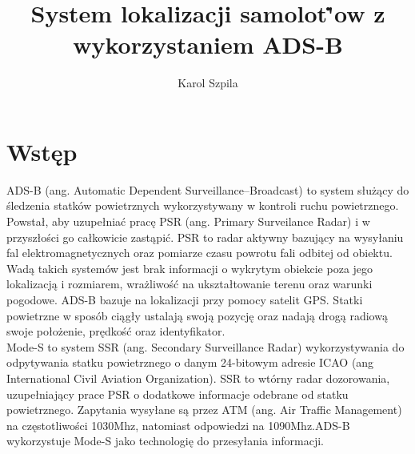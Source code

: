 \documentclass[eng,printmode]{mgr}
\title{System lokalizacji samolot\.'ow z wykorzystaniem ADS-B}
\author{Karol Szpila}
\begin{document}

\maketitle %

\tableofcontents %

\let\cleardoublepage\clearpage %

\chapter{ Wstęp }
ADS-B (ang. Automatic Dependent Surveillance–Broadcast) to system służący do śledzenia statków powietrznych wykorzystywany w kontroli ruchu powietrznego. Powstał, aby uzupełniać pracę PSR (ang. Primary Surveilance Radar) i w przyszłości go całkowicie zastąpić. PSR to radar aktywny bazujący na wysyłaniu fal elektromagnetycznych oraz pomiarze czasu powrotu fali odbitej od obiektu. Wadą takich systemów jest brak informacji o wykrytym obiekcie poza jego lokalizacją i rozmiarem, wrażliwość na ukształtowanie terenu oraz warunki pogodowe. ADS-B bazuje na lokalizacji przy pomocy satelit GPS. Statki powietrzne w sposób ciągły ustalają swoją pozycję oraz nadają drogą radiową swoje położenie, prędkość oraz identyfikator.
\\


Mode-S to system SSR (ang. Secondary Surveillance Radar) wykorzystywania do odpytywania statku powietrznego o danym 24-bitowym adresie ICAO (ang International Civil Aviation Organization). SSR to wtórny radar dozorowania, uzupełniający prace PSR o dodatkowe informacje odebrane od statku powietrznego. Zapytania wysyłane są przez ATM (ang. Air Traffic Management) na częstotliwości 1030Mhz, natomiast odpowiedzi na 1090Mhz.ADS-B wykorzystuje Mode-S jako technologię do przesyłania informacji.
\end{document}
